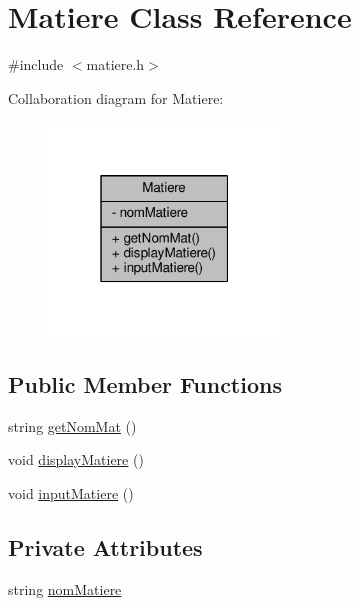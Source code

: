 \hypertarget{class_matiere}{\section{Matiere Class Reference}
\label{class_matiere}
}


{\ttfamily \#include $<$matiere.\+h$>$}



Collaboration diagram for Matiere\+:\nopagebreak
\begin{figure}[H]
\begin{center}
\leavevmode
\includegraphics[width=175pt]{class_matiere__coll__graph}
\end{center}
\end{figure}
\subsection*{Public Member Functions}
\begin{DoxyCompactItemize}
\item 
string \hyperlink{class_matiere_a51db02074e8da744c8d83e21ccc87141}{get\+Nom\+Mat} ()
\item 
void \hyperlink{class_matiere_a0ad25e7a36a710e6a81e4ff2e0e1e39c}{display\+Matiere} ()
\item 
void \hyperlink{class_matiere_a5280bde49139a6cc89b4198797df6a15}{input\+Matiere} ()
\end{DoxyCompactItemize}
\subsection*{Private Attributes}
\begin{DoxyCompactItemize}
\item 
string \hyperlink{class_matiere_a701728c9283e82fd270a91a8eb541917}{nom\+Matiere}
\end{DoxyCompactItemize}


